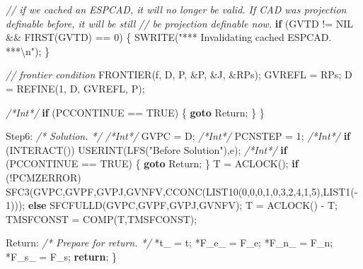 \documentclass[
]{book}
\newenvironment{Shaded}{\begin{snugshade}}{\end{snugshade}}
\newcommand{\CharTok}[1]{\textcolor[rgb]{0.31,0.60,0.02}{#1}}
\newcommand{\CommentTok}[1]{\textcolor[rgb]{0.56,0.35,0.01}{\textit{#1}}}
\newcommand{\ControlFlowTok}[1]{\textcolor[rgb]{0.13,0.29,0.53}{\textbf{#1}}}
\newcommand{\DecValTok}[1]{\textcolor[rgb]{0.00,0.00,0.81}{#1}}
\newcommand{\NormalTok}[1]{#1}
\newcommand{\SpecialCharTok}[1]{\textcolor[rgb]{0.00,0.00,0.00}{#1}}
\newcommand{\StringTok}[1]{\textcolor[rgb]{0.31,0.60,0.02}{#1}}
\theoremstyle{definition}
\theoremstyle{definition}
\theoremstyle{definition}
\theoremstyle{definition}
\theoremstyle{remark}
\begin{document}
\begin{Shaded}
\begin{Highlighting}[numbers=left,,]
        \CommentTok{// if we cached an ESPCAD, it will no longer be valid. If CAD was projection definable before, it will be still}
        \CommentTok{// be projection definable now.}
        \ControlFlowTok{if}\NormalTok{ (GVTD != NIL \&\& FIRST(GVTD) == }\DecValTok{0}\NormalTok{) \{}
\NormalTok{            SWRITE(}\StringTok{"*** Invalidating cached ESPCAD. ***}\SpecialCharTok{\textbackslash{}n}\StringTok{"}\NormalTok{);}
\NormalTok{        \}}

        \CommentTok{// frontier condition}
\NormalTok{        FRONTIER(f, D, P, \&P, \&J, \&RPs);}
\NormalTok{        GVREFL = RPs;}
\NormalTok{        D = REFINE(}\DecValTok{1}\NormalTok{, D, GVREFL, P);}

        \CommentTok{/*Int*/} \ControlFlowTok{if}\NormalTok{ (PCCONTINUE == TRUE) \{ }\ControlFlowTok{goto}\NormalTok{ Return; \}}
\NormalTok{    \}}

\NormalTok{Step6: }\CommentTok{/* Solution. */}
    \CommentTok{/*Int*/}\NormalTok{ GVPC = D;}
    \CommentTok{/*Int*/}\NormalTok{ PCNSTEP = }\DecValTok{1}\NormalTok{;}
    \CommentTok{/*Int*/} \ControlFlowTok{if}\NormalTok{ (INTERACT()) USERINT(LFS(}\StringTok{"Before Solution"}\NormalTok{),}\CharTok{\textquotesingle{}e\textquotesingle{}}\NormalTok{);}
    \CommentTok{/*Int*/} \ControlFlowTok{if}\NormalTok{ (PCCONTINUE == TRUE) \{ }\ControlFlowTok{goto}\NormalTok{ Return; \}}
\NormalTok{    T = ACLOCK();}
    \ControlFlowTok{if}\NormalTok{ (!PCMZERROR)}
\NormalTok{        SFC3(GVPC,GVPF,GVPJ,GVNFV,CCONC(LIST10(}\DecValTok{0}\NormalTok{,}\DecValTok{0}\NormalTok{,}\DecValTok{0}\NormalTok{,}\DecValTok{1}\NormalTok{,}\DecValTok{0}\NormalTok{,}\DecValTok{3}\NormalTok{,}\DecValTok{2}\NormalTok{,}\DecValTok{4}\NormalTok{,}\DecValTok{1}\NormalTok{,}\DecValTok{5}\NormalTok{),LIST1({-}}\DecValTok{1}\NormalTok{)));}
    \ControlFlowTok{else}
\NormalTok{        SFCFULLD(GVPC,GVPF,GVPJ,GVNFV);}
\NormalTok{    T = ACLOCK() {-} T;}
\NormalTok{    TMSFCONST = COMP(T,TMSFCONST);}

\NormalTok{Return: }\CommentTok{/* Prepare for return. */}
\NormalTok{    *t\_ = t;}
\NormalTok{    *F\_e\_ = F\_e;}
\NormalTok{    *F\_n\_ = F\_n;}
\NormalTok{    *F\_s\_ = F\_s;}
    \ControlFlowTok{return}\NormalTok{;}
\NormalTok{\}}
\end{Highlighting}
\end{Shaded}
\end{document}
